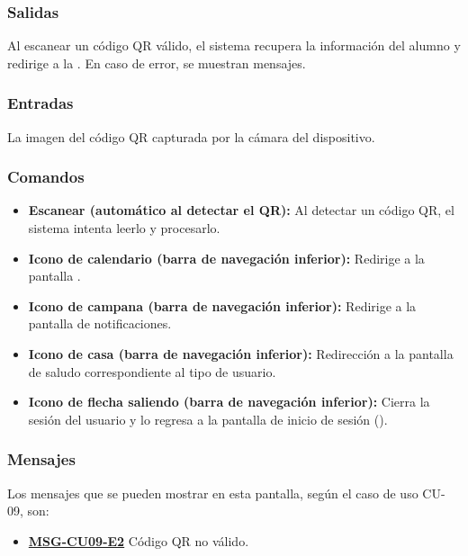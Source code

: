 \subsubsection{Salidas}
Al escanear un código QR válido, el sistema recupera la información del alumno y redirige a la . En caso de error, se muestran mensajes.

\subsubsection{Entradas}
La imagen del código QR capturada por la cámara del dispositivo.

\subsubsection{Comandos}
\begin{itemize}
	\item \textbf{Escanear (automático al detectar el QR):} Al detectar un código QR, el sistema intenta leerlo y procesarlo.
	\item \textbf{Icono de calendario (barra de navegación inferior):} Redirige a la pantalla .
	\item \textbf{Icono de campana (barra de navegación inferior):} Redirige a la pantalla de notificaciones.
	\item \textbf{Icono de casa (barra de navegación inferior):} Redirección a la pantalla de saludo correspondiente al tipo de usuario.
	\item \textbf{Icono de flecha saliendo (barra de navegación inferior):} Cierra la sesión del usuario y lo regresa a la pantalla de inicio de sesión ().
\end{itemize}

\subsubsection{Mensajes}
Los mensajes que se pueden mostrar en esta pantalla, según el caso de uso CU-09, son:
\begin{itemize}
	\item \textbf{\hyperref[msg:CU09-E2]{MSG-CU09-E2}} Código QR no válido.
\end{itemize}


